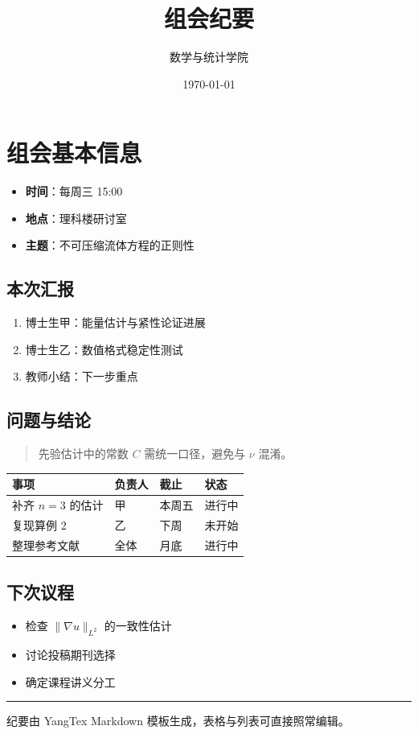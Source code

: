 \documentclass[UTF8,a4paper,11pt,fontset=fandol]{ctexart}
\title{组会纪要}
\author{数学与统计学院}
\date{\today}
\begin{document}
\maketitle

\section{组会基本信息}

\begin{itemize}
  \item \textbf{时间}：每周三 15:00
  \item \textbf{地点}：理科楼研讨室
  \item \textbf{主题}：不可压缩流体方程的正则性
\end{itemize}

\subsection{本次汇报}

\begin{enumerate}
  \item 博士生甲：能量估计与紧性论证进展
  \item 博士生乙：数值格式稳定性测试
  \item 教师小结：下一步重点
\end{enumerate}

\subsection{问题与结论}

\begin{quote}
先验估计中的常数 $C$ 需统一口径，避免与 $\nu$ 混淆。
\end{quote}

\begin{center}
\begin{tabular}{l|l|l|l}
\hline
事项 & 负责人 & 截止 & 状态 \\
\hline
补齐 $n=3$ 的估计 & 甲 & 本周五 & 进行中 \\
复现算例 2 & 乙 & 下周 & 未开始 \\
整理参考文献 & 全体 & 月底 & 进行中 \\
\hline
\end{tabular}
\end{center}

\subsection{下次议程}

\begin{itemize}
  \item 检查 $\|\nabla u\|_{L^2}$ 的一致性估计
  \item 讨论投稿期刊选择
  \item 确定课程讲义分工
\end{itemize}

\par\noindent\rule{\textwidth}{0.4pt}\par

纪要由 YangTex Markdown 模板生成，表格与列表可直接照常编辑。
\end{document}
